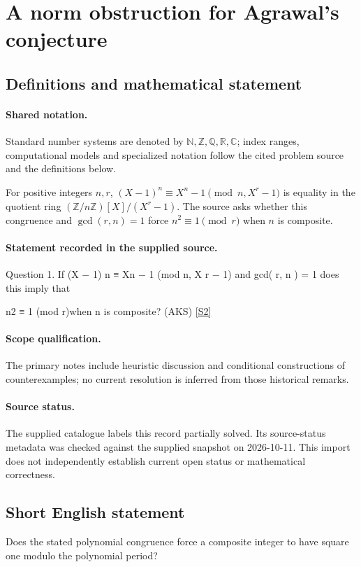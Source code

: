 \documentclass[11pt]{article}
\newcommand{\sref}[2]{\hyperlink{source:#1:#2}{[S#2]}}
\begin{document}
\section{A norm obstruction for Agrawal's conjecture}\label{statement}

\subsection{Definitions and mathematical statement}

\paragraph{Shared notation.}Standard number systems are denoted by $\mathbb N,\mathbb Z,\mathbb Q,\mathbb R,\mathbb C$; index ranges, computational models and specialized notation follow the cited problem source and the definitions below.


For positive integers $n,r$, $(X-1)^n\equiv X^n-1\pmod{n,X^r-1}$ is equality in the quotient ring $(\mathbb Z/n\mathbb Z)[X]/(X^r-1)$. The source asks whether this congruence and $\gcd(r,n)=1$ force $n^2\equiv1\pmod r$ when $n$ is composite.
\paragraph{Statement recorded in the supplied source.}
Question 1. If (X − 1) n ≡ Xn − 1 (mod n, X r − 1) and gcd( r, n ) = 1 does this imply that

n2 ≡ 1 (mod r)when n is composite? (AKS) \sref{statement}{2}
\paragraph{Scope qualification.}
The primary notes include heuristic discussion and conditional constructions of counterexamples; no current resolution is inferred from those historical remarks.
\paragraph{Source status.}
The supplied catalogue labels this record partially solved. Its source-status metadata was checked against the supplied snapshot on 2026-10-11. This import does not independently establish current open status or mathematical correctness.
\subsection{Short English statement}
Does the stated polynomial congruence force a composite integer to have square one modulo the polynomial period?
\end{document}
